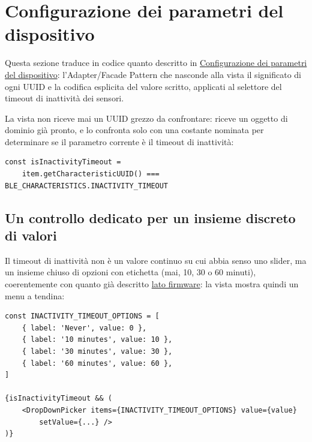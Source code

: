 \newpage

\section{Configurazione dei parametri del dispositivo}

Questa sezione traduce in codice quanto descritto in
\hyperref[sec:app-config]{Configurazione dei parametri del dispositivo}:
l'Adapter/Facade Pattern che nasconde alla vista il significato di ogni
UUID e la codifica esplicita del valore scritto, applicati al selettore del
timeout di inattività dei sensori.

La vista non riceve mai un UUID grezzo da confrontare: riceve un oggetto di
dominio già pronto, e lo confronta solo con una costante nominata per
determinare se il parametro corrente è il timeout di inattività:

\begin{listing}[H]
\begin{verbatim}
const isInactivityTimeout =
    item.getCharacteristicUUID() === BLE_CHARACTERISTICS.INACTIVITY_TIMEOUT
\end{verbatim}
\caption{Riconoscimento del parametro di timeout tramite l'oggetto di dominio}
\label{listing:config-selector}
\end{listing}

\subsection{Un controllo dedicato per un insieme discreto di valori}
Il timeout di inattività non è un valore continuo su cui abbia senso uno
slider, ma un insieme chiuso di opzioni con etichetta (mai, 10, 30 o 60
minuti), coerentemente con quanto già descritto \hyperref[sec:inattivita]{lato firmware}: la vista
mostra quindi un menu a tendina:

\begin{listing}[H]
\begin{verbatim}
const INACTIVITY_TIMEOUT_OPTIONS = [
    { label: 'Never', value: 0 },
    { label: '10 minutes', value: 10 },
    { label: '30 minutes', value: 30 },
    { label: '60 minutes', value: 60 },
]

{isInactivityTimeout && (
    <DropDownPicker items={INACTIVITY_TIMEOUT_OPTIONS} value={value}
        setValue={...} />
)}
\end{verbatim}
\caption{Menu a tendina per il timeout di inattività}
\label{listing:config-dropdown}
\end{listing}


